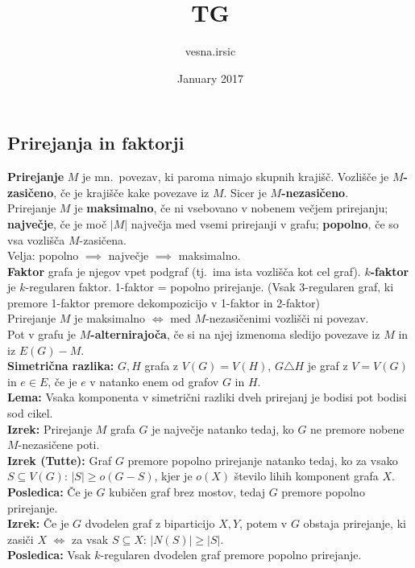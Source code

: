 \documentclass[a4paper,10pt]{article}
\title{TG}
\author{vesna.irsic}
\date{January 2017}
\theoremstyle{definition}
\let\oldtextbf\textbf
\renewcommand{\textbf}[1]{\oldtextbf{\boldmath #1}}
\begin{document}

\subsection*{Prirejanja in faktorji}
\textbf{Prirejanje} $M$ je mn.\ povezav, ki paroma nimajo skupnih krajišč. Vozlišče je \textbf{$M$-zasičeno}, če je krajišče kake povezave iz $M$. Sicer je \textbf{$M$-nezasičeno}.\\
Prirejanje $M$ je \textbf{maksimalno}, če ni vsebovano v nobenem večjem prirejanju; \textbf{največje}, če je moč $|M|$ največja med vsemi prirejanji v grafu; \textbf{popolno}, če so vsa vozlišča $M$-zasičena.\\
Velja: popolno $\implies$ največje $\implies$ maksimalno.\\
\textbf{Faktor} grafa je njegov vpet podgraf (tj.\ ima ista vozlišča kot cel graf). \textbf{$k$-faktor} je $k$-regularen faktor. 1-faktor = popolno prirejanje. (Vsak 3-regularen graf, ki premore 1-faktor premore dekompozicijo v 1-faktor in 2-faktor)\\
Prirejanje $M$ je maksimalno $\iff$ med $M$-nezasičenimi vozlišči ni povezav.\\
Pot v grafu je \textbf{$M$-alternirajoča}, če si na njej izmenoma sledijo povezave iz $M$ in iz $E(G) - M$.\\
\textbf{Simetrična razlika:} $G, H$ grafa z $V(G) = V(H)$, $G \triangle H$ je graf z $V = V(G)$ in $e \in E$, če je $e$ v natanko enem od grafov $G$ in $H$.\\
\textbf{Lema:} Vsaka komponenta v simetrični razliki dveh prirejanj je bodisi pot bodisi sod cikel.\\
\textbf{Izrek:} Prirejanje $M$ grafa $G$ je največje natanko tedaj, ko $G$ ne premore nobene $M$-nezasičene poti.\\
\textbf{Izrek (Tutte):} Graf $G$ premore popolno prirejanje natanko tedaj, ko za vsako $S \subseteq V(G)$: $|S| \geq o(G - S)$, kjer je $o(X)$ število lihih komponent grafa $X$.\\
\textbf{Posledica:} Če je $G$ kubičen graf brez mostov, tedaj $G$ premore popolno prirejanje.\\
\textbf{Izrek:} Če je $G$ dvodelen graf z biparticijo $X, Y$, potem v $G$ obstaja prirejanje, ki zasiči $X$ $\iff$ za vsak $S \subseteq X$: $|N(S)| \geq |S|$.\\
\textbf{Posledica:} Vsak $k$-regularen dvodelen graf premore popolno prirejanje.
\end{document}
